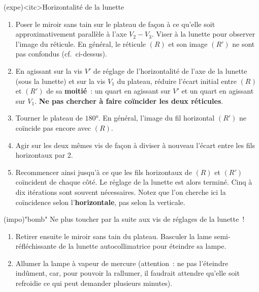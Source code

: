 \documentclass[../main/main.tex]{subfiles}
\begin{document}
{\begin{tcb}(expe)<itc>{Horizontalité de la lunette}
  \begin{enumerate}
  \item Poser le miroir sans tain sur le plateau de façon à ce qu'elle soit
  approximativement parallèle à l'axe $V_2-V_3$. Viser à la lunette pour
  observer l'image du réticule. En général, le réticule $(R)$ et son image
  $(R')$ ne sont pas  confondus (cf.\ ci-dessus).

  \item En agissant sur la vis $V'$ de réglage de l'horizontalité de l'axe de
  la lunette (sous la lunette) et sur la vis $V_1$ du plateau, réduire l'écart
  initial entre $(R)$ et $(R')$ de sa \textbf{moitié}~: un quart en agissant sur
  $V'$ et un quart en agissant sur $V_1$. \textbf{Ne pas chercher à faire
  coïncider les deux réticules}.

  \item Tourner le plateau de $\ang{180;;}$. En général, l'image du fil
  horizontal $(R')$ ne coïncide pas encore avec $(R)$.

  \item Agir sur les deux mêmes vis de façon à diviser à nouveau l'écart entre
  les fils horizontaux par 2.

  \item Recommencer ainsi jusqu'à ce que les fils horizontaux de $(R)$ et
  $(R')$ coïncident de chaque côté. Le réglage de la lunette est alors terminé.
  Cinq à dix itérations sont souvent nécessaires. Notez que l'on cherche ici la
  coïncidence selon l'\textbf{horizontale}, pas selon la verticale.

  \end{enumerate}

  \begin{center}
    \begin{tcb}[bld, cnt, width=.9\linewidth](impo)"bomb"{}
    Ne plus toucher par la suite aux vis de réglages de la lunette~!
  \end{tcb}
  \end{center}

\begin{enumerate}[resume]
  \item Retirer ensuite le miroir sans tain du plateau. Basculer la lame
    semi-réfléchissante de la lunette autocollimatrice pour éteindre sa lampe.

  \item Allumer la lampe à vapeur de mercure (attention~: ne pas l'éteindre
    indûment, car, pour pouvoir la rallumer, il faudrait attendre qu'elle soit
    refroidie ce qui peut demander plusieurs minutes).
\end{enumerate}


\end{tcb}}
\end{document}
